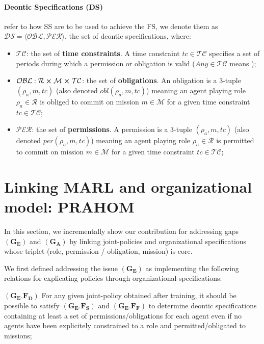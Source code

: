 \documentclass[runningheads]{llncs}
\newcounter{relation}
\begin{document}
\paragraph{\textbf{Deontic Specifications (DS)}} refer to how SS are to be used to achieve the FS, we denote them as $\mathcal{DS} = \langle \mathcal{OBL},\mathcal{PER} \rangle$, the set of deontic specifications, where:

\begin{itemize}
    \item $\mathcal{TC}$: the set of \textbf{time constraints}. A time constraint $tc \in \mathcal{TC}$ specifies a set of periods during which a permission or obligation is valid ($Any \in \mathcal{TC}$ means );
    \item $\mathcal{OBL}: \mathcal{R} \cross \mathcal{M} \cross \mathcal{TC}$: the set of \textbf{obligations}. An obligation is a 3-tuple $(\rho_a,m,tc)$ (also denoted $obl(\rho_a,m,tc)$) meaning an agent playing role $\rho_a \in \mathcal{R}$ is obliged to commit on mission $m \in \mathcal{M}$ for a given time constraint $tc \in \mathcal{TC}$;
    \item $\mathcal{PER}$: the set of \textbf{permissions}. A permission is a 3-tuple $(\rho_a,m,tc)$ (also denoted $per(\rho_a,m,tc)$) meaning an agent playing role $\rho_a \in \mathcal{R}$ is permitted to commit on mission $m \in \mathcal{M}$ for a given time constraint $tc \in \mathcal{TC}$;
\end{itemize}



\section{Linking MARL and organizational model: PRAHOM}

In this section, we incrementally show our contribution for addressing gaps $(\mathbf{G_E})$ and $(\mathbf{G_A})$ by linking joint-policies and organizational specifications whose triplet (role, permission / obligation, mission) is core.

We first defined addressing the issue $(\mathbf{G_E})$ as implementing the following relations for explicating policies through organizational specifications:

\noindent $(\mathbf{G_E.F_D})$ \quad For any given joint-policy obtained after training, it should be possible to satisfy $(\mathbf{G_E.F_S})$ and $(\mathbf{G_E.F_F})$ to determine deontic specifications containing at least a set of permissions/obligations for each agent even if no agents have been explicitely constrained to a role and permitted/obligated to missions;
\end{document}
